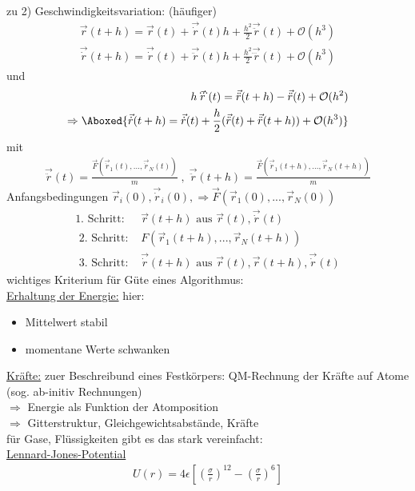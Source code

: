 \documentclass[12pt]{article}
\begin{document}
zu 2) Geschwindigkeitsvariation: (häufiger)
\begin{align}
\vec{r}(t+h) = \vec{r}(t) + \vec{\dot{r}} (t) h + \frac{h^2}{2} \vec{\ddot{r}}(t) + \mathcal{O}(h^3) \\
\vec{\dot{r}}(t+h) = \vec{\dot{r}}(t) + \vec{\ddot{r}} (t) h + \frac{h^2}{2} \vec{\dddot{r}}(t) + \mathcal{O}(h^3) 
\end{align}
und
\begin{align}
h \vec{\dddot{r}}(t) = \vec{\ddot{r}} (t+h) - \vec{\ddot{r}} (t) + \mathcal{O}(h^2) \\
\Rightarrow \Aboxed{ \vec{\dot{r}} (t+h) = \vec{\dot{r}} (t) + \frac{h}{2} ( \vec{\ddot{r}} (t) + \vec{\ddot{r}} (t+h) ) + \mathcal{O}(h^3) }  
\end{align}
mit
\begin{align}
\vec{\ddot{r}} (t)= \frac{\vec{F} (\vec{\dot{r}}_1 (t), ... , \vec{\dot{r}}_N (t) ) }{m} \; , \; 
\vec{\ddot{r}} (t+h)= \frac{\vec{F} (\vec{\dot{r}}_1 (t+h), ... , \vec{\dot{r}}_N (t+h) ) }{m}
\end{align}
Anfangsbedingungen $\vec{r}_i (0), \vec{\dot{r}}_i (0), \Rightarrow \vec{F}(\vec{r}_1 (0), ..., \vec{r}_N (0))$
\begin{align}
\mbox{1. Schritt: } & \vec{r}(t+h) \mbox{ aus } \vec{r}(t), \vec{\dot{r}}(t) \\
\mbox{ 2. Schritt: } &  F( \vec{r}_1 (t+h),..., \vec{r}_N (t+h)) \\
\mbox{ 3. Schritt: } & \vec{\dot{r}}(t+h) \mbox{ aus } \vec{r}(t), \vec{r}(t+h), \vec{\dot{r}}(t)
\end{align}
wichtiges Kriterium für Güte eines Algorithmus:\\
\underline{Erhaltung der Energie:} hier: 
\begin{itemize}
\item Mittelwert stabil
\item momentane Werte schwanken
\end{itemize}
\underline{Kräfte:} zuer Beschreibund eines Festkörpers: QM-Rechnung der Kräfte auf Atome (sog. ab-initiv Rechnungen) \\
$\Rightarrow$ Energie als Funktion der Atomposition \\
$\Rightarrow$ Gitterstruktur, Gleichgewichtsabstände, Kräfte \\
für Gase, Flüssigkeiten gibt es das stark vereinfacht:
\\
\underline{Lennard-Jones-Potential} 
\begin{align}
U(r) = 
4 \epsilon 
\left[ \left(  \frac{ \sigma }{r}  \right)^{12} - \left( \frac{\sigma }{r} \right)^6 \right]
\end{align}
\end{document}
